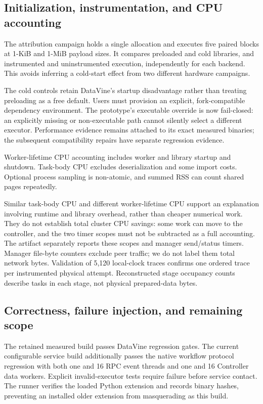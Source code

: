 \subsection{Initialization, instrumentation, and CPU accounting}
The attribution campaign holds a single allocation and executes five paired
blocks at 1-KiB and 1-MiB payload sizes. It compares preloaded and cold libraries,
and instrumented and uninstrumented execution, independently for each backend.
This avoids inferring a cold-start effect from two different hardware campaigns.


The cold controls retain DataVine's startup disadvantage rather than treating
preloading as a free default. Users must provision an explicit, fork-compatible
dependency environment. The prototype's executable override is now fail-closed:
an explicitly missing or non-executable path cannot silently select a different
executor. Performance evidence remains attached to its exact measured binaries;
the subsequent compatibility repairs have separate regression evidence.

Worker-lifetime CPU accounting includes worker and library startup and shutdown.
Task-body CPU excludes deserialization and some import costs. Optional process
sampling is non-atomic, and summed RSS can count shared pages repeatedly.
\begin{table}[t]
\centering\small
\caption{Median CPU seconds. DV uses fixed admission. Worker lifetime aggregates
both worker process trees; it excludes manager, controller, and client CPU.}

\end{table}
Similar task-body CPU and different worker-lifetime CPU support an explanation
involving runtime and library overhead, rather than cheaper numerical work.
They do not establish total cluster CPU savings: some work can move to the
controller, and the two timer scopes must not be subtracted as a full accounting.
The artifact separately reports these scopes and manager send/status timers.
Manager file-byte counters exclude peer traffic; we do not label them total
network bytes. Validation of 5,120 local-clock traces confirms one ordered
trace per instrumented physical attempt. Reconstructed stage occupancy counts
describe tasks in each stage, not physical prepared-data bytes.

\subsection{Correctness, failure injection, and remaining scope}
The retained measured build passes \UpgradeRegressionPassed{} DataVine regression
gates. The current configurable service build additionally passes the native
workflow protocol regression with both one and 16 RPC event threads and one and
16 Controller data workers.
Explicit invalid-executor tests require failure before service contact.
The runner verifies the loaded Python extension and records binary hashes,
preventing an installed older extension from masquerading as this build.

